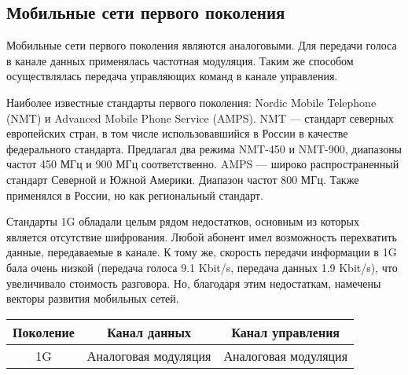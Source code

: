 \subsection{Мобильные сети первого поколения}
Мобильные сети первого поколения являются аналоговыми. Для передачи голоса в канале данных применялась частотная модуляция. Таким же способом осуществлялась передача управляющих команд в канале управления.

Наиболее известные стандарты первого поколения: Nordic Mobile Telephone (NMT) и Advanced Mobile Phone Service (AMPS).
NMT --- стандарт северных европейских стран, в том числе использовавшийся в России в качестве федерального стандарта. Предлагал два режима NMT-450 и NMT-900, диапазоны частот 450 МГц и 900 МГц соответственно.
AMPS --- широко распространенный стандарт Северной и Южной Америки. Диапазон частот 800 МГц. Также применялся в России, но как региональный стандарт.

Стандарты 1G обладали целым рядом недостатков, основным из которых является отсутствие шифрования. Любой абонент имел возможность перехватить данные, передаваемые в канале. К тому же, скорость передачи информации в 1G бала очень низкой (передача голоса 9.1 Kbit/s, передача данных 1.9 Kbit/s), что увеличивало стоимость разговора. Но, благодаря этим недостаткам, намечены векторы развития мобильных сетей.

\begin{table}[H]
    \centering
    \begin{tabular}{|c|c|c|}
        \hline
        Поколение & Канал данных & Канал управления\\
        \hline
        1G & Аналоговая модуляция & Аналоговая модуляция\\
        \hline
    \end{tabular}
\end{table}